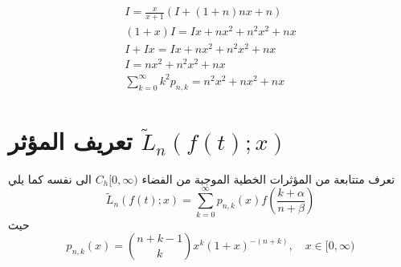 	\begin{gather*}
		I = \frac{x}{x+1} (I + (1+n)nx + n)\\
		(1+x) I = Ix + nx^2 + n^2x^2 + nx\\
		I + I x = Ix + nx^2 + n^2x^2 + nx\\
		I = nx^2 + n^2x^2 + nx\\
		\sum_{k=0}^{\infty}k^2 p_{n,k} = n^2 x^2 + nx^2 + nx
	\end{gather*}
	
\newcommand{\tL}{\tilde{L}}
\section{تعريف المؤثر $\tL_n(f(t);x)$}
تعرف متتابعة من المؤثرات الخطية الموجبة من الفضاء $C_h[0, \infty)$ الى نفسه كما يلي
\[
\tL_n(f(t); x) = \sum_{k=0}^{\infty} p_{n, k}(x) f\left(\frac{k+\alpha}{n+\beta}\right)
\]
حيث
\[
p_{n,k} (x) = \binom{n+k-1}{k} x^k (1+x)^{-(n+k)}, \quad x \in [0, \infty)
\]

